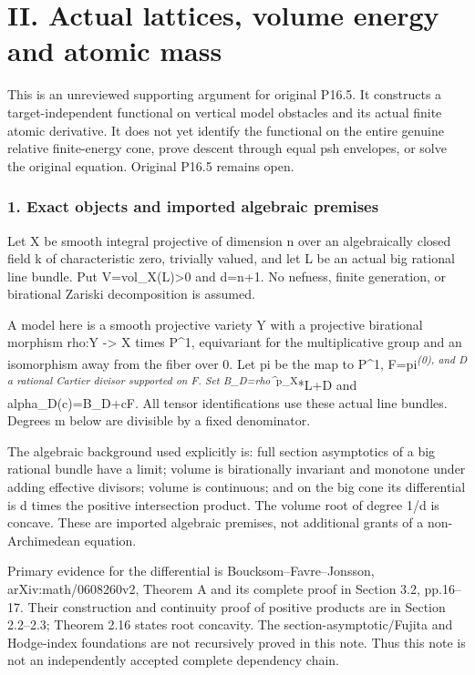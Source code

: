 \documentclass[
  10pt,
]{article}
\begin{document}
\section{II. Actual lattices, volume energy and atomic
mass}\label{ii.-actual-lattices-volume-energy-and-atomic-mass}

This is an unreviewed supporting argument for original P16.5. It
constructs a target-independent functional on vertical model obstacles
and its actual finite atomic derivative. It does not yet identify the
functional on the entire genuine relative finite-energy cone, prove
descent through equal psh envelopes, or solve the original equation.
Original P16.5 remains open.

\subsubsection{1. Exact objects and imported algebraic
premises}\label{exact-objects-and-imported-algebraic-premises}

Let X be smooth integral projective of dimension n over an algebraically
closed field k of characteristic zero, trivially valued, and let L be an
actual big rational line bundle. Put V=vol\_X(L)\textgreater0 and d=n+1.
No nefness, finite generation, or birational Zariski decomposition is
assumed.

A model here is a smooth projective variety Y with a projective
birational morphism rho:Y -\textgreater{} X times P\^{}1, equivariant
for the multiplicative group and an isomorphism away from the fiber over
0. Let pi be the map to P\^{}1, F=pi\textsuperscript{\emph{(0), and D a
rational Cartier divisor supported on F. Set B\_D=rho\^{}}p\_X}*L+D and
alpha\_D(c)=B\_D+cF. All tensor identifications use these actual line
bundles. Degrees m below are divisible by a fixed denominator.

The algebraic background used explicitly is: full section asymptotics of
a big rational bundle have a limit; volume is birationally invariant and
monotone under adding effective divisors; volume is continuous; and on
the big cone its differential is d times the positive intersection
product. The volume root of degree 1/d is concave. These are imported
algebraic premises, not additional grants of a non-Archimedean equation.

Primary evidence for the differential is Boucksom--Favre--Jonsson,
arXiv:math/0608260v2, Theorem A and its complete proof in Section 3.2,
pp.16--17. Their construction and continuity proof of positive products
are in Section 2.2--2.3; Theorem 2.16 states root concavity. The
section-asymptotic/Fujita and Hodge-index foundations are not
recursively proved in this note. Thus this note is not an independently
accepted complete dependency chain.
\end{document}
